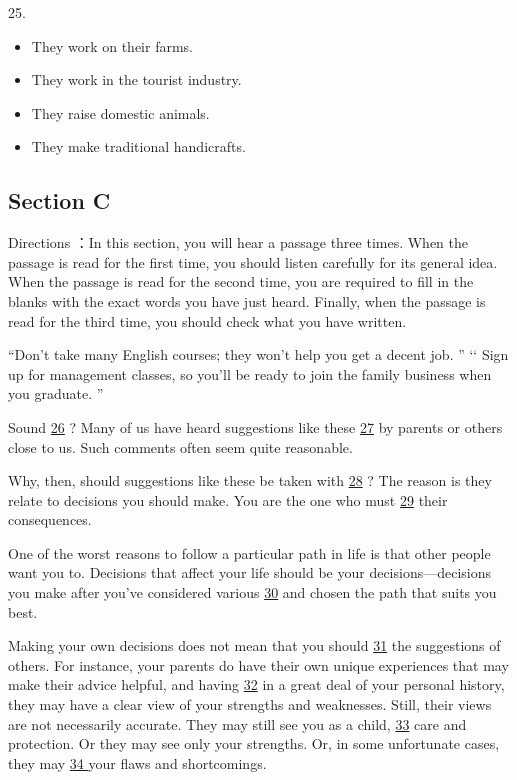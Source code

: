 \documentclass[UTF8,11pt]{ctexart}
\begin{document}
25.


\begin{itemize}[leftmargin=2em,itemsep=.2em,topsep=.4em]\item[A.] They work on their farms.
\item[B.] They work in the tourist industry.
\item[C.] They raise domestic animals.
\item[D.] They make traditional handicrafts.
\end{itemize}

\subsection*{Section C}


Directions ：In this section, you will hear a passage three times. When the passage is read for the first time, you should listen carefully for its general idea. When the passage is read for the second time, you are required to fill in the blanks with the exact words you have just heard. Finally, when the passage is read for the third time, you should check what you have written.


“Don’t take many English courses; they won’t help you get a decent job. ” ‘‘ Sign up for management classes, so you’ll be ready to join the family business when you graduate. ”


Sound \uline{26} ? Many of us have heard suggestions like these \uline{27} by parents or others close to us. Such comments often seem quite reasonable.


Why, then, should suggestions like these be taken with \uline{28} ? The reason is they relate to decisions you should make. You are the one who must \uline{29} their consequences.


One of the worst reasons to follow a particular path in life is that other people want you to. Decisions that affect your life should be your decisions—decisions you make after you’ve considered various \uline{30} and chosen the path that suits you best.


Making your own decisions does not mean that you should \uline{31} the suggestions of others. For instance, your parents do have their own unique experiences that may make their advice helpful, and having \uline{32} in a great deal of your personal history, they may have a clear view of your strengths and weaknesses. Still, their views are not necessarily accurate. They may still see you as a child, \uline{33} care and protection. Or they may see only your strengths. Or, in some unfortunate cases, they may \uline{34 }your flaws and shortcomings.
\end{document}
